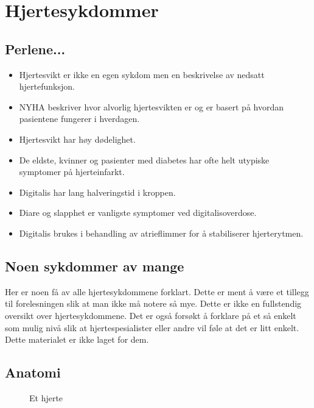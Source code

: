 	\chapter{Hjertesykdommer}
		
		\section{Perlene...}
			\begin{itemize}
				\item Hjertesvikt er ikke en egen sykdom men en beskrivelse av nedsatt hjertefunksjon.\\
				\item NYHA beskriver hvor alvorlig hjertesvikten er og er basert på hvordan pasientene fungerer i hverdagen.\\
				\item Hjertesvikt har høy dødelighet.\\
				\item De eldste, kvinner og pasienter med diabetes har ofte helt utypiske symptomer på hjerteinfarkt.\\
				\item Digitalis har lang halveringstid i kroppen.\\
				\item Diare og slapphet er vanligste symptomer ved digitalisoverdose.\\
				\item Digitalis brukes i behandling av atrieflimmer for å stabiliserer hjerterytmen.\\
			\end{itemize}

		\section{Noen sykdommer av mange}	
			Her er noen få av alle hjertesykdommene forklart. Dette er ment å være et tillegg til forelesningen slik at man ikke må notere så mye. Dette er ikke en fullstendig oversikt over hjertesykdommene. Det er også forsøkt å forklare på et så enkelt som mulig nivå slik at hjertespesialister eller andre vil føle at det er litt enkelt. Dette materialet er ikke laget for dem.\\
		\section{Anatomi}
					\begin{figure}[ht]
                      \centering
                      \caption{Et hjerte}
                    \end{figure}    


